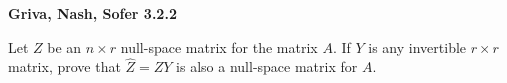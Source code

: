 \textbf{Griva, Nash, Sofer 3.2.2}

Let $Z$ be an $n \times r$ null-space matrix for the matrix $A$. If $Y$ is any invertible $r \times r$ matrix, prove
that $\hat{Z} = ZY$ is also a null-space matrix for $A$.

\begin{solution}
  \ \\
\end{solution}